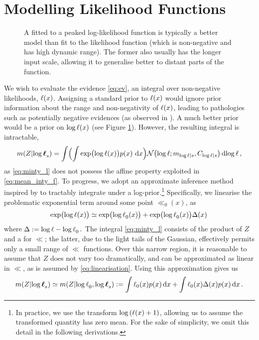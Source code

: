 \documentclass{article} %
\begin{document}
\section{Modelling Likelihood Functions}\label{sec:model_lik}
%
 \begin{figure}
 \centering
 \caption{A \gpb fitted to a peaked log-likelihood function  is typically a better model than \gpb fit to the likelihood function (which is non-negative and has high dynamic range). The former \gpb  also usually has the longer input scale, allowing it to generalise better to distant parts of the function. }
 \label{fig:log_is_better}
 \end{figure}
%
We wish to evaluate the evidence \eqref{eq:ev}, an integral over non-negative likelihoods, $\lfn(\lfv)$. Assigning a standard \gpb prior to $\lfn(\lfv)$ would ignore prior information about the range and non-negativity of $\lfn(\lfv)$, leading to pathologies such as potentially negative evidences (as observed in \cite{BZMonteCarlo}).  A much better prior would be a \gpb prior on $\log \lfn(x)$ (see Figure \ref{fig:log_is_better}). However, the resulting integral is intractable,
\begin{equation}\label{eq:minty_l}
\mean{\If}{\vll_s}
 =\int \Bigl( \int \exp\bigl(\ll(\lfv)\bigr)\po{\lfv}\,\ud\lfv\Bigr)
\N{\ll}{\meancondfn{\ll}{s}}{C_{\ll|s}} \ud \ll\,,
\end{equation}
as \eqref{eq:minty_l} does not possess the affine property exploited in \eqref{eq:mean_inty_f}. To progress, we adopt an approximate inference method inspired by \cite{BQR} to tractably integrate under a log-\gpb prior.\footnote{In practice, we use the transform 
$\log\left(\lfn(\lfv) + 1\right)$, allowing us to assume the transformed quantity has zero mean. For the sake of simplicity, we omit this detail in the following derivations.} 
Specifically, we linearise the problematic exponential term around some point $\ll_0(x)$, as
\begin{equation}
 \exp\bigl(\ll(\lfv)\bigr) \simeq \exp\bigl(\ll_0(\lfv)\bigr) + \exp\bigl(\ll_0(\lfv)\bigr) \Delta(x)\label{eq:linearisation}\,
\end{equation}
where 
$
\Delta \deq \ll  - \ll_0 \,.
$
The integral \eqref{eq:minty_l} consists of the product of $Z$ and a \gpb for $\ll$; the latter, due to the light tails of the Gaussian, effectively permits only a small range of $\ll$ functions. Over this narrow region, it is reasonable to assume that $Z$ does not vary too dramatically, and can be approximated as linear in $\ll$, as is assumed by \eqref{eq:linearisation}. Using this approximation gives us
\begin{equation}\label{eq:minty_l}
\mean{\If}{\vll_s}
 \simeq 
\mean{\If}{\ll_0, \vll_s}
\deq
\int \lfn_0(\lfv)\po{\lfv}\ud\lfv
+\int \lfn_0(\lfv)\Delta(x)\po{\lfv}\ud\lfv
\,.
\end{equation}
\end{document}
